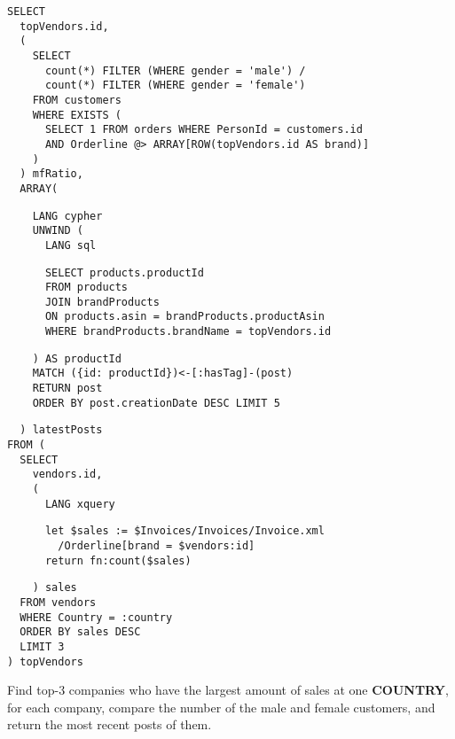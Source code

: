 \begin{listing}[!ht]
\begin{verbatim}
SELECT
  topVendors.id,
  (
    SELECT
      count(*) FILTER (WHERE gender = 'male') /
      count(*) FILTER (WHERE gender = 'female')
    FROM customers
    WHERE EXISTS (
      SELECT 1 FROM orders WHERE PersonId = customers.id
      AND Orderline @> ARRAY[ROW(topVendors.id AS brand)]
    )
  ) mfRatio,
  ARRAY(
\end{verbatim}
\nestedMintedVspace
\begin{verbatim}
    LANG cypher
    UNWIND (
      LANG sql
\end{verbatim}
\nestedMintedVspace
\begin{verbatim}
      SELECT products.productId
      FROM products
      JOIN brandProducts
      ON products.asin = brandProducts.productAsin
      WHERE brandProducts.brandName = topVendors.id
\end{verbatim}
\nestedMintedVspace
\begin{verbatim}
    ) AS productId
    MATCH ({id: productId})<-[:hasTag]-(post)
    RETURN post
    ORDER BY post.creationDate DESC LIMIT 5
\end{verbatim}
\nestedMintedVspace
\begin{verbatim}
  ) latestPosts
FROM (
  SELECT
    vendors.id,
    (
      LANG xquery
\end{verbatim}
\nestedMintedVspace
\begin{verbatim}
      let $sales := $Invoices/Invoices/Invoice.xml
        /Orderline[brand = $vendors:id]
      return fn:count($sales)
\end{verbatim}
\nestedMintedVspace
\begin{verbatim}
    ) sales
  FROM vendors
  WHERE Country = :country
  ORDER BY sales DESC
  LIMIT 3
) topVendors
\end{verbatim}
\caption{Find top-3 companies who have the largest amount of sales at one \textbf{COUNTRY}, for each company, compare the number of the male and female customers, and return the most recent posts of them.}
\end{listing}

